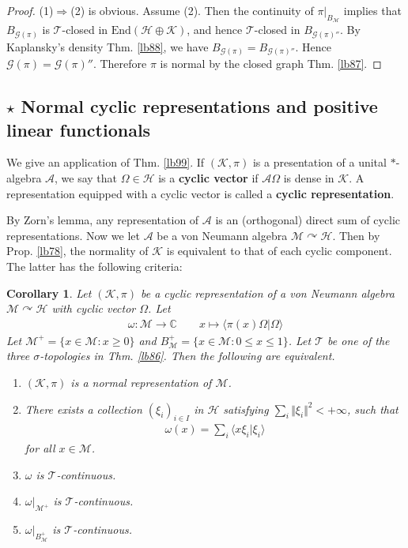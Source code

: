 \documentclass[12pt,b5paper,notitlepage]{article}
\theoremstyle{definition}
\theoremstyle{plain}
\newtheorem{co}[df]{Corollary}
\newcommand{\mc}{\mathcal}
\newcommand{\End}{\mathrm{End}} %
\newcommand{\bk}[1]{\langle {#1}\rangle}
\newcommand{\scr}{\mathscr}
\newcommand{\Cbb}{\mathbb C}
\numberwithin{equation}{section}
\begin{document}
\begin{proof}
(1)$\Rightarrow$(2) is obvious. Assume (2). Then the continuity of $\pi|_{B_{\mc M}}$ implies that $B_{\scr G(\pi)}$ is $\mc T$-closed in $\End(\mc H\oplus\mc K)$, and hence $\mc T$-closed in $B_{\scr G(\pi)''}$. By Kaplansky's density Thm. \ref{lb88}, we have $B_{\scr G(\pi)}=B_{\scr G(\pi)''}$. Hence $\scr G(\pi)=\scr G(\pi)''$. Therefore $\pi$ is normal by the closed graph Thm. \ref{lb87}.
\end{proof}



\subsection*{$\star$ Normal cyclic representations and positive linear functionals}

We give an application of Thm. \ref{lb99}. If $(\mc K,\pi)$ is a presentation of a unital $*$-algebra $\scr A$, we say that $\Omega\in\mc H$ is a \textbf{cyclic vector} if $\scr A\Omega$ is dense in $\mc K$. A representation equipped with a cyclic vector is called a \textbf{cyclic representation}. 

By Zorn's lemma, any representation of $\scr A$ is an (orthogonal) direct sum of cyclic representations. Now we let $\scr A$ be a von Neumann algebra $\mc M\curvearrowright\mc H$. Then by Prop. \ref{lb78}, the normality of $\mc K$ is equivalent to that of each cyclic component. The latter has the following criteria:


\begin{co}\label{lb102}
Let $(\mc K,\pi)$ be a cyclic representation of a von Neumann algebra $\mc M\curvearrowright\mc H$ with cyclic vector $\Omega$. Let
\begin{align}
\omega:\mc M\rightarrow\Cbb\qquad x\mapsto\bk{\pi(x)\Omega|\Omega}\label{eq37}
\end{align}
Let $\mc M^+=\{x\in\mc M:x\geq0\}$ and $B^+_{\mc M}=\{x\in\mc M:0\leq x\leq 1\}$. Let $\mc T$ be one of the three $\sigma$-topologies in Thm. \ref{lb86}. Then the following are equivalent.
\begin{enumerate}[label=(\arabic*)]
\item $(\mc K,\pi)$ is a normal representation of $\mc M$.
\item There exists a collection $(\xi_i)_{i\in I}$ in $\mc H$ satisfying $\sum_i\Vert\xi_i\Vert^2<+\infty$, such that  
\begin{align*}
\omega(x)=\sum_i \bk{x\xi_i|\xi_i}
\end{align*}
for all $x\in\mc M$.
\item $\omega$ is $\mc T$-continuous.
\item $\omega|_{\mc M^+}$ is $\mc T$-continuous.
\item $\omega|_{B^+_{\mc M}}$ is $\mc T$-continuous.
\end{enumerate}
\end{co}
\end{document}
